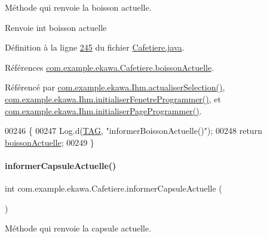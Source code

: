 Méthode qui renvoie la boisson actuelle. 

\begin{DoxyReturn}{Renvoie}
int boisson actuelle 
\end{DoxyReturn}


Définition à la ligne \hyperlink{_cafetiere_8java_source_l00245}{245} du fichier \hyperlink{_cafetiere_8java_source}{Cafetiere.\+java}.



Références \hyperlink{_cafetiere_8java_source_l00088}{com.\+example.\+ekawa.\+Cafetiere.\+boisson\+Actuelle}.



Référencé par \hyperlink{_ihm_8java_source_l00892}{com.\+example.\+ekawa.\+Ihm.\+actualiser\+Selection()}, \hyperlink{_ihm_8java_source_l00727}{com.\+example.\+ekawa.\+Ihm.\+initialiser\+Fenetre\+Programmer()}, et \hyperlink{_ihm_8java_source_l00668}{com.\+example.\+ekawa.\+Ihm.\+initialiser\+Page\+Programmer()}.


\begin{DoxyCode}
00246     \{
00247         Log.d(\hyperlink{classcom_1_1example_1_1ekawa_1_1_cafetiere_aa0c1fd99a2508b06c462aea17034aa91}{TAG}, \textcolor{stringliteral}{"informerBoissonActuelle()"});
00248         \textcolor{keywordflow}{return} \hyperlink{classcom_1_1example_1_1ekawa_1_1_cafetiere_a73c5fa3b510655e1e3425140336b7f5b}{boissonActuelle};
00249     \}
\end{DoxyCode}
\mbox{\label{classcom_1_1example_1_1ekawa_1_1_cafetiere_a3251d1865f3a4113553e1743a971984d}} 
\paragraph{\texorpdfstring{informer\+Capsule\+Actuelle()}{informerCapsuleActuelle()}}
{\footnotesize\ttfamily int com.\+example.\+ekawa.\+Cafetiere.\+informer\+Capsule\+Actuelle (\begin{DoxyParamCaption}{ }\end{DoxyParamCaption})}



Méthode qui renvoie la capsule actuelle. 

